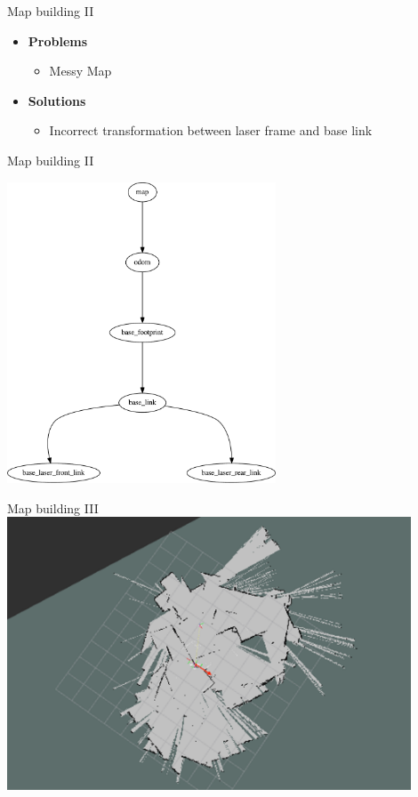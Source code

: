 \begin{frame}{Map building II}
\begin{itemize}
	\item \textbf{Problems}
		\begin{itemize}
			\item Messy Map
		\end{itemize}
	\item \textbf{Solutions}
		\begin{itemize}
			\item Incorrect transformation between laser frame and base link
		\end{itemize}
\end{itemize}
\end{frame}
\begin{frame}{Map building II}
    \begin{center}
    \includegraphics[width=0.6\textwidth]{gfx/frames_cleaned.pdf}
    \end{center}
\end{frame}
\begin{frame}{Map building III}
    \centering
    \includegraphics[width=0.9\textwidth]{gfx/map_messy.png}
\end{frame}
